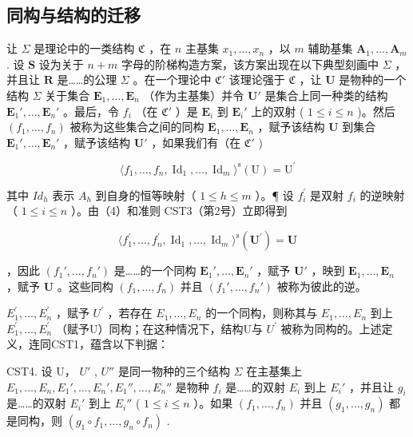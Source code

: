 \subsection{同构与结构的迁移}

让 \(\Sigma\) 是理论中的一类结构 \(\mathfrak{C}\) ，在 \(n\) 主基集 \(x_{1},\ldots ,x_{n}\) ，以 \(m\) 辅助基集 \(\mathbf{A}_1,\dots ,\mathbf{A}_m\) . 设 \(\mathbf{S}\) 设为关于 \(n + m\) 字母的阶梯构造方案，该方案出现在以下典型刻画中 \(\Sigma\) ，并且让 \(\mathbf{R}\) 是……的公理 \(\Sigma\) 。在一个理论中 \(\mathfrak{C}'\) 该理论强于 \(\mathfrak{C}\) ，让 \(\mathbf{U}\) 是物种的一个结构 \(\Sigma\) 关于集合 \(\mathbf{E}_1,\ldots ,\mathbf{E}_n\) （作为主基集）并令 \(\mathbf{U}'\) 是集合上同一种类的结构 \(\mathbf{E}_1',\ldots ,\mathbf{E}_n'\) 。最后，令 \(f_{i}\) （在 \(\mathfrak{C}'\) ）是 \(\mathbf{E}_i\) 到 \(\mathbf{E}_i'\) 上的双射 ( \(1 \leqslant i \leqslant n\) )。然后 \((f_1, \ldots, f_n)\) 被称为这些集合之间的同构 \(\mathbf{E}_1, \ldots, \mathbf{E}_n\) ，赋予该结构 \(\mathbf{U}\) 到集合 \(\mathbf{E}_1', \ldots, \mathbf{E}_n'\) ，赋予该结构 \(\mathbf{U}'\) ，如果我们有（在 \(\mathfrak{C}'\) )

\[
\langle f _ {1}, \dots , f _ {n}, \operatorname{Id} _ {1}, \dots , \operatorname{Id} _ {m} \rangle^ {\mathrm{s}} (\mathrm{U}) = \mathrm{U} ^ {\prime}\tag{4}
\]

其中 \(Id_{h}\) 表示 \(A_{h}\) 到自身的恒等映射（ \(1 \leqslant h \leqslant m\) ）。¶ 设 \(f_{i}^{\prime}\) 是双射 \(f_{i}\) 的逆映射（ \(1 \leqslant i \leqslant n\) ）。由（4）和准则 CST3（第2号）立即得到

\[
\langle f _ {1} ^ {\prime}, \dots , f _ {n} ^ {\prime}, \operatorname{Id} _ {1}, \dots , \operatorname{Id} _ {m} \rangle^ {\mathrm{s}} (\mathbf {U} ^ {\prime}) = \mathbf {U}
\]

，因此 \((f_1', \ldots, f_n')\) 是……的一个同构 \(\mathbf{E}_1', \ldots, \mathbf{E}_n'\) ，赋予 \(\mathbf{U}'\) ，映到 \(\mathbf{E}_1, \ldots, \mathbf{E}_n\) ，赋予 \(\mathbf{U}\) 。这些同构 \((f_1, \ldots, f_n)\) 并且 \((f_1', \ldots, f_n')\) 被称为彼此的逆。

\(E_{1}^{\prime}, \ldots, E_{n}^{\prime}\) ，赋予 \(U^{\prime}\) ，若存在 \(E_{1}, \ldots, E_{n}\) 的一个同构，则称其与 \(E_{1}, \ldots, E_{n}\) 到上 \(E_{1}^{\prime}, \ldots, E_{n}^{\prime}\) （赋予U）同构；在这种情况下，结构U与 \(U^{\prime}\) 被称为同构的。上述定义，连同CST1，蕴含以下判据：

CST4. 设 U， \(U'\) , \(U''\) 是同一物种的三个结构 \(\Sigma\) 在主基集上 \(E_{1}, \ldots, E_{n}, E_{1}', \ldots, E_{n}', E_{1}'', \ldots, E_{n}''\) 是物种 \(f_{i}\) 是……的双射 \(E_{i}\) 到上 \(E_{i}'\) ，并且让 \(g_{i}\) 是……的双射 \(E_{i}'\) 到上 \(E_{i}''\) ( \(1 \leqslant i \leqslant n\) ）。如果 \((f_{1}, \ldots, f_{n})\) 并且 \((g_{1}, \ldots, g_{n})\) 都是同构，则 \((g_{1} \circ f_{1}, \ldots, g_{n} \circ f_{n})\) .

